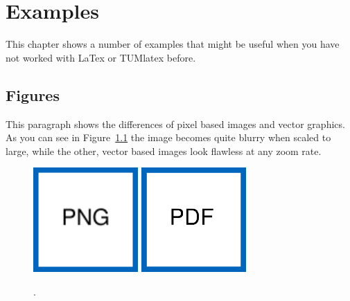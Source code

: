 \chapter{Examples}%

This chapter shows a number of examples that might be useful when you have not worked with LaTex or TUMlatex before.

\section{Figures}
This paragraph shows the differences of pixel based images and vector graphics.
As you can see in Figure~\cref{fig:MyImage} the  image becomes quite blurry when scaled to large, while the other, vector based images look flawless at any zoom rate.%
%
\begin{figure}[htb]%
    \centering%
    \includegraphics[width=40mm]{figures/ImagePNG.png}%
    \hspace*{5mm}%
    \includegraphics[width=40mm]{figures/ImagePDF.pdf}\par%
    \begingroup%
    \resizebox{40mm}{!}{}%
    \endgroup%
    \hspace*{5mm}%
    \begingroup%
    \def\svgwidth{40mm}%
    \fontsize{25}{25}\selectfont%
    \endgroup%
    \caption{.}%
    \label{fig:MyImage}%
\end{figure}%

